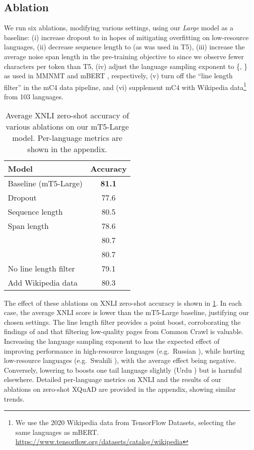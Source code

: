 \documentclass[11pt]{article}
\begin{document}
\subsection{Ablation} \label{sec:ablation}



We run six ablations, modifying various settings, using our \textit{Large} model as a baseline: (i) increase dropout to  in hopes of mitigating overfitting on low-resource languages, (ii) decrease sequence length to  (as was used in T5), (iii) increase the average noise span length in the pre-training objective to  since we observe fewer characters per token than T5, (iv) adjust the language sampling exponent  to \{, \} as used in MMNMT \citep{arivazhagan2019massively} and mBERT \citep{devlin2018multilingual}, respectively, (v) turn off the ``line length filter'' in the mC4 data pipeline, and (vi) supplement mC4 with Wikipedia data\footnote{We use the 2020 Wikipedia data from TensorFlow Datasets, selecting the same languages as mBERT. \url{https://www.tensorflow.org/datasets/catalog/wikipedia}} from 103 languages.

\begin{table}[t]
\centering
\footnotesize
\begin{tabular}{lc}
\toprule
Model & Accuracy \\
\midrule
Baseline (mT5-Large) & \textbf{81.1} \\
Dropout  & 77.6 \\
Sequence length  & 80.5 \\
Span length  & 78.6 \\
 & 80.7 \\
 & 80.7 \\
No line length filter & 79.1 \\
Add Wikipedia data & 80.3 \\
\bottomrule
\end{tabular}
\caption{Average XNLI zero-shot accuracy of various ablations on our mT5-Large model. Per-language metrics are shown in the appendix.}
\label{tbl:xnli_ablation_short}
\end{table}

The effect of these ablations on XNLI zero-shot accuracy is shown in \cref{tbl:xnli_ablation_short}.
In each case, the average XNLI score is lower than the mT5-Large baseline, justifying our chosen settings.
The line length filter provides a  point boost, corroborating the findings of \citet{conneau2019unsupervised} and \citet{2020t5} that filtering low-quality pages from Common Crawl is valuable.
Increasing the language sampling exponent  to  has the expected effect of improving performance in high-resource languages (e.g.~Russian ), while hurting low-resource languages (e.g.~Swahili ), with the average effect being negative.
Conversely, lowering  to  boosts one tail language slightly (Urdu ) but is harmful elsewhere.
Detailed per-language metrics on XNLI and the results of our ablations on zero-shot XQuAD are provided in the appendix, showing similar trends.
\end{document}
